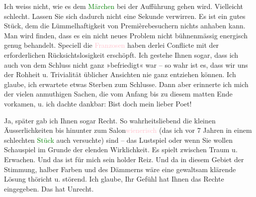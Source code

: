 \pstart
           Ich weiss nicht, wie es dem \textcolor{green}{Märchen}\ledrightnote{\textcolor{green}{Das Märchen. Schauspiel in drei Aufzügen}} bei der
               Aufführung gehen wird. Vielleicht schlecht. Lassen Sie sich dadurch nicht eine
               Sekunde verwirren. Es ist ein gutes Stück, dem die Lümmelhaftigkeit von
               Premièrebesuchern nichts anhaben kann. Man wird finden, dass es ein nicht neues
               Problem nicht {\pb}bühnenmässig energisch
               genug behandelt. Speciell die \textcolor{pink}{Franzosen}\ledrightnote{\textcolor{pink}{Frankreich}} haben
               derlei Conflicte mit der erforderlichen Rücksichtslosigkeit erschöpft. Ich gestehe
               Ihnen sogar, dass ich auch von dem Schluss nicht ganz »befriedigt« war – so wahr ist
               es, dass wir uns der Rohheit u. Trivialität üblicher Ansichten nie ganz entziehen
               können. Ich glaube, ich erwartete etwas Sterben zum Schlusse. Dann aber erinnerte ich
               mich der vielen anmuthigen Sachen, die vom Anfang bis zu diesem matten Ende vorkamen,
               u. ich dachte  dankbar: Bist doch mein lieber
               Poet!\pend
           
\pstart
           Ja, später gab ich Ihnen sogar Recht. So wahrheitsliebend die kleinen
               Äusserlichkeiten bis hinunter zum Salon\textcolor{pink}{wienerisch}\ledrightnote{\textcolor{pink}{Wien}}
               (das ich vor 7 Jahren in einem schlechten \textcolor{green}{Stück}\ledrightnote{{$\rightarrow$}\emph{\textcolor{green}{Muttersöhnchen. Lustspiel in vier Akten}}} auch versuchte) sind – das Lustspiel oder wenn Sie
               wollen {\pb}Schauspiel \label{K_L03823-6v}\label{K_L03823-6} im Grunde der elenden Wirklichkeit.
               Es spielt zwischen Traum u. Erwachen. Und das ist für mich sein holder Reiz. Und da
               in diesem Gebiet der Stimmung, halber Farben und des Dämmerns wäre eine gewaltsam
               klärende Lösung thöricht u. störend. Ich glaube, Ihr Gefühl hat Ihnen das Rechte
               eingegeben. Das \label{K_L03823-7v}\label{K_L03823-7} hat Unrecht.\pend
           
